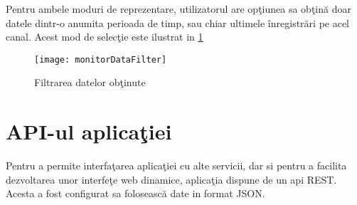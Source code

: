 Pentru ambele moduri de reprezentare, utilizatorul are opţiunea sa obţină doar datele dintr-o anumita perioada de timp, sau chiar ultimele înregistrări pe acel canal. Acest mod de selecţie este ilustrat in \cref{fig:monitorDataFilter}
\begin{figure}[H]
	\centering
	\texttt{[image: monitorDataFilter]}
	\caption{Filtrarea datelor obţinute}
	\label{fig:monitorDataFilter}
\end{figure}
\section{API-ul aplicaţiei}
Pentru a permite interfaţarea aplicaţiei cu alte servicii, dar si pentru a facilita dezvoltarea unor interfeţe web dinamice, aplicaţia dispune de un api REST. Acesta a fost configurat sa folosească date in format JSON.

